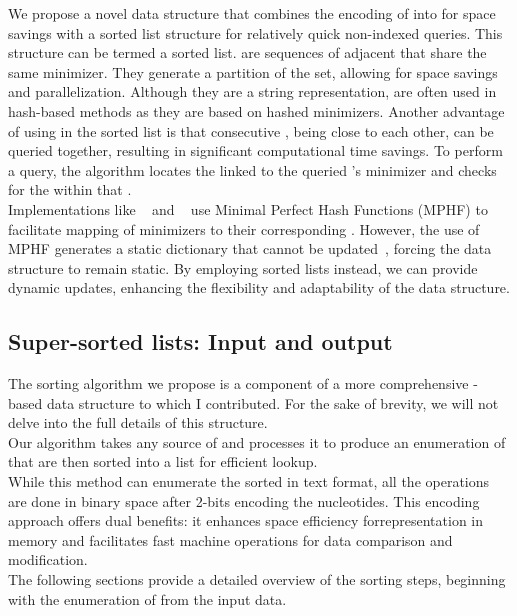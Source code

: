 We propose a novel data structure that combines the encoding of \kmers into \skmers for space savings with a sorted list structure for relatively quick non-indexed \kmer queries. This structure can be termed a \skmers sorted list.
\skmers are sequences of adjacent \kmers that share the same minimizer. They generate a partition of the \kmer set, allowing for space savings and parallelization. Although they are a string representation, \skmers are often used in hash-based methods as they are based on hashed minimizers. Another advantage of using \skmers in the sorted list is that consecutive \kmers, being close to each other, can be queried together, resulting in significant computational time savings. To perform a query, the algorithm locates the \skmer linked to the queried \kmer's minimizer and checks for the \kmer within that \skmer.\\
Implementations like \blight~\cite{blight} and \ssh~\cite{sshash} use Minimal Perfect Hash Functions (\gls{MPHF}) to facilitate mapping of minimizers to their corresponding \skmers. However, the use of MPHF generates a static dictionary that cannot be updated~\cite{smsketch}, forcing the data structure to remain static. By employing sorted \skmers lists instead, we can provide dynamic updates, enhancing the flexibility and adaptability of the data structure.

\subsection{Super-\kmers sorted lists: Input and output}
The \skmer sorting algorithm we propose is a component of a more comprehensive \skmer-based data structure to which I contributed. For the sake of brevity, we will not delve into the full details of this structure.\\
Our algorithm takes any source of \kmers and processes it to produce an enumeration of \skmer that are then sorted into a list for efficient lookup.\\
While this method can enumerate the sorted \skmer in text format, all the operations are done in binary space after 2-bits encoding the nucleotides. This encoding approach offers dual benefits: it enhances space efficiency for\kmer representation in memory and facilitates fast machine operations for data comparison and modification.\\
The following sections provide a detailed overview of the sorting steps, beginning with the enumeration of \skmers from the input data.

